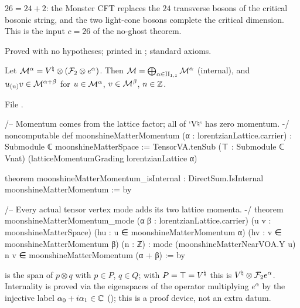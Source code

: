 \begin{physics}
$26=24+2$: the Monster CFT replaces the $24$ transverse bosons of the critical bosonic string, and the two
light-cone bosons complete the critical dimension.  This is the input $c=26$ of the no-ghost theorem.
\end{physics}

\begin{status}
Proved with no hypotheses; printed in ; standard axioms.
\end{status}

\begin{theorem}\label{ch17:thm:mattermomentum}
Let $\mathcal{M}^\alpha={V^{\natural}}\otimes(\mathcal{F}_2\otimes e^\alpha)$.  Then $\mathcal{M}=\bigoplus_{\alpha\in{\mathrm{II}_{1,1}}}\mathcal{M}^\alpha$
(internal), and $u_{(n)}v\in\mathcal{M}^{\alpha+\beta}$ for $u\in\mathcal{M}^\alpha$, $v\in\mathcal{M}^\beta$, $n\in{\mathbb{Z}}$.
\end{theorem}

\noindent File .
\begin{leancode}
/-- Momentum comes from the lattice factor; all of `V♮` has zero momentum. -/
noncomputable def moonshineMatterMomentum (α : lorentzianLattice.carrier) : Submodule ℂ moonshineMatterSpace :=
  TensorVA.tenSub (⊤ : Submodule ℂ Vnat) (latticeMomentumGrading lorentzianLattice α)

theorem moonshineMatterMomentum_isInternal : DirectSum.IsInternal moonshineMatterMomentum := by

/-- Every actual tensor vertex mode adds its two lattice momenta. -/
theorem moonshineMatterMomentum_mode (α β : lorentzianLattice.carrier)
    (u v : moonshineMatterSpace) (hu : u ∈ moonshineMatterMomentum α)
    (hv : v ∈ moonshineMatterMomentum β) (n : ℤ) :
    mode (moonshineMatterNearVOA.Y u) n v ∈ moonshineMatterMomentum (α + β) := by
\end{leancode}

\begin{dictionary}
 is the span of $p\otimes q$ with $p\in P$, $q\in Q$; with $P=\top={V^{\natural}}$ this is
${V^{\natural}}\otimes\mathcal{F}_2e^\alpha$.  Internality is proved via the eigenspaces of the operator multiplying $e^\alpha$ by the
injective label $\alpha_0+i\alpha_1\in{\mathbb{C}}$ (); this is a proof device, not an extra datum.
\end{dictionary}

